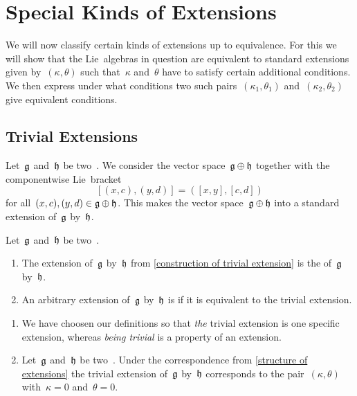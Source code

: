 \section{Special Kinds of Extensions}


\begin{fluff}
	We will now classify certain kinds of extensions up to equivalence.
	For this we will show that the Lie~algebras in question are equivalent to standard extensions given by~$(\kappa, \theta)$ such that~$\kappa$ and~$\theta$ have to satisfy certain additional conditions.
	We then express under what conditions two such pairs~$(\kappa_1, \theta_1)$ and~$(\kappa_2, \theta_2)$ give equivalent conditions.
\end{fluff}



\subsection{Trivial Extensions}


\begin{example}
	\label{construction of trivial extension}
	Let~$\mathfrak{g}$ and~$\mathfrak{h}$ be two~\liealgebras{$\kf$}.
	We consider the vector space~$\mathfrak{g} \oplus \mathfrak{h}$ together with the componentwise Lie~bracket
	\[
		[ (x,c), (y,d) ]
		=
		( [x,y], [c,d] )
	\]
	for all~$(x,c), (y,d) \in \mathfrak{g} \oplus \mathfrak{h}$.
	This makes the vector space~$\mathfrak{g} \oplus \mathfrak{h}$ into a standard extension of~$\mathfrak{g}$ by~$\mathfrak{h}$.
\end{example}


\begin{definition}
	Let~$\mathfrak{g}$ and~$\mathfrak{h}$ be two~\liealgebras{$\kf$}.
	\begin{enumerate}
		\item
			The extension of~$\mathfrak{g}$ by~$\mathfrak{h}$ from \cref{construction of trivial extension} is the  of~$\mathfrak{g}$ by~$\mathfrak{h}$.
		\item
			An arbitrary extension of~$\mathfrak{g}$ by~$\mathfrak{h}$ is  if it is equivalent to the trivial extension.
	\end{enumerate}
\end{definition}


\begin{remark}
	\leavevmode
	\begin{enumerate}
		\item
			We have choosen our definitions so that \emph{the} trivial extension is one specific extension, whereas \emph{being trivial} is a property of an extension.
		\item
			Let~$\mathfrak{g}$ and~$\mathfrak{h}$ be two~\liealgebras{$\kf$}.
			Under the correspondence from \cref{structure of extensions} the trivial extension of~$\mathfrak{g}$ by~$\mathfrak{h}$ corresponds to the pair~$(\kappa, \theta)$ with~$\kappa = 0$ and~$\theta = 0$.
	\end{enumerate}
\end{remark}


